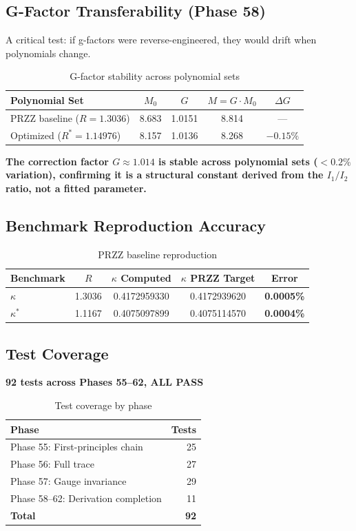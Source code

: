 \documentclass[11pt]{article}
\begin{document}
\subsection{G-Factor Transferability (Phase 58)}

A critical test: if g-factors were reverse-engineered, they would drift when polynomials change.

\begin{table}[h]
\centering
\caption{G-factor stability across polynomial sets}
\begin{tabular}{lcccc}
\toprule
Polynomial Set & $M_0$ & $G$ & $M = G \cdot M_0$ & $\Delta G$ \\
\midrule
PRZZ baseline ($R=1.3036$) & 8.683 & 1.0151 & 8.814 & --- \\
Optimized ($R^*=1.14976$) & 8.157 & 1.0136 & 8.268 & $-0.15\%$ \\
\bottomrule
\end{tabular}
\end{table}

\textbf{The correction factor $G \approx 1.014$ is stable across polynomial sets ($<0.2\%$ variation), confirming it is a structural constant derived from the $I_1/I_2$ ratio, not a fitted parameter.}

\subsection{Benchmark Reproduction Accuracy}

\begin{table}[h]
\centering
\caption{PRZZ baseline reproduction}
\begin{tabular}{lcccc}
\toprule
Benchmark & $R$ & $\kappa$ Computed & $\kappa$ PRZZ Target & Error \\
\midrule
$\kappa$ & 1.3036 & 0.4172959330 & 0.4172939620 & \textbf{0.0005\%} \\
$\kappa^*$ & 1.1167 & 0.4075097899 & 0.4075114570 & \textbf{0.0004\%} \\
\bottomrule
\end{tabular}
\end{table}

\subsection{Test Coverage}

\textbf{92 tests across Phases 55--62, ALL PASS}

\begin{table}[h]
\centering
\caption{Test coverage by phase}
\begin{tabular}{lr}
\toprule
Phase & Tests \\
\midrule
Phase 55: First-principles chain & 25 \\
Phase 56: Full trace & 27 \\
Phase 57: Gauge invariance & 29 \\
Phase 58--62: Derivation completion & 11 \\
\midrule
\textbf{Total} & \textbf{92} \\
\bottomrule
\end{tabular}
\end{table}
\end{document}
